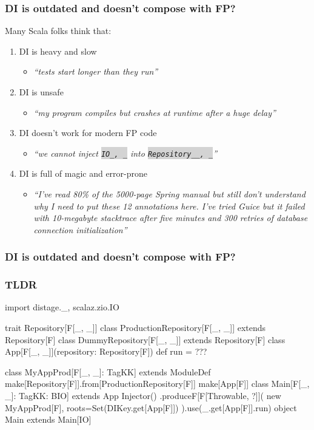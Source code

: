 \documentclass[usenames,dvipsnames]{beamer}
\newcommand{\code}[1]{\colorbox{lightgray}{\texttt{#1}}}
\begin{document}
\begin{frame}
\frametitle{DI is outdated and doesn't compose with FP?}
  Many Scala folks think that:
  \begin{enumerate}
  \item DI is heavy and slow
  \begin{itemize}
    \item \textit{``tests start longer than they run''}
  \end{itemize}
  \item DI is unsafe
  \begin{itemize}
    \item \textit{``my program compiles but crashes at runtime after a huge delay''}
  \end{itemize}
  \item DI doesn't work for modern FP code
  \begin{itemize}
    \item \textit{``we cannot inject \code{IO\lbrack\_, \_\rbrack} into \code{Repository\lbrack\_\lbrack\_, \_\rbrack\rbrack}''}
  \end{itemize}
  \item DI is full of magic and error-prone
  \begin{itemize}
    \item \textit{``I've read 80\% of the 5000-page Spring manual but still don't understand why I need to put these 12 annotations here.
    I've tried Guice but it failed with 10-megabyte stacktrace after five minutes and 300 retries of database connection initialization''}
  \end{itemize}
  \end{enumerate}
\end{frame}

\begin{frame}
\frametitle{DI is outdated and doesn't compose with FP?}
  \newline
\end{frame}

\begin{frame}[fragile]
\frametitle{TLDR}
  \begin{scalacode}
import distage._, scalaz.zio.IO

trait Repository[F[_, _]]
class ProductionRepository[F[_, _]] extends Repository[F]
class DummyRepository[F[_, _]] extends Repository[F]
class App[F[_, _]](repository: Repository[F]) { def run = ??? }

class MyAppProd[F[_, _]: TagKK] extends ModuleDef {
  make[Repository[F]].from[ProductionRepository[F]]
  make[App[F]]
}
class Main[F[_, _]: TagKK: BIO] extends App {
  Injector()
    .produceF[F[Throwable, ?]](
      new MyAppProd[F], roots=Set(DIKey.get[App[F]])
    ).use(_.get[App[F]].run)
}
object Main extends Main[IO]
  \end{scalacode}
\end{frame}
\end{document}
